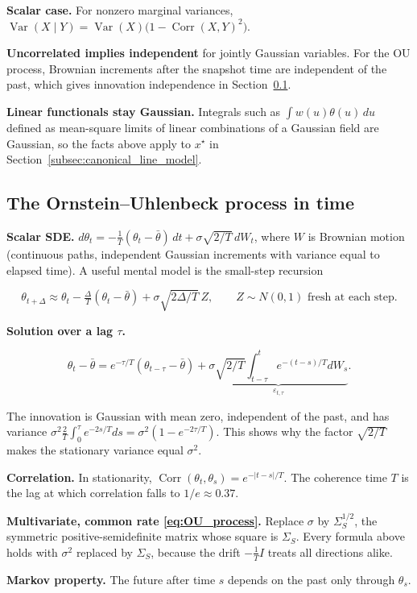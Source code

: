 \textbf{Scalar case.} For nonzero marginal variances, $\operatorname{Var}(X\mid Y)=\operatorname{Var}(X)\big(1-\operatorname{Corr}(X,Y)^2\big)$.

\textbf{Uncorrelated implies independent} for jointly Gaussian variables. For the OU process, Brownian increments after the snapshot time are independent
of the past, which gives innovation independence in Section~\ref{app:toolkit-4}.

\textbf{Linear functionals stay Gaussian.} Integrals such as $\int w(u)\theta(u)\,du$ defined as mean-square limits of linear combinations of a Gaussian field are Gaussian, so the facts above apply to $x^\star$ in Section~\ref{subsec:canonical_line_model}.

\subsection{The Ornstein--Uhlenbeck process in time}
\label{app:toolkit-4}
\textbf{Scalar SDE.} $d\theta_t=-\tfrac1T(\theta_t-\bar\theta)\,dt+\sigma\sqrt{2/T}\,dW_t$, where $W$ is Brownian motion (continuous paths, independent Gaussian increments with variance equal to elapsed time). A useful mental model is the small-step recursion

\[
\theta_{t+\Delta}\approx\theta_t-\tfrac{\Delta}{T}(\theta_t-\bar\theta)+\sigma\sqrt{2\Delta/T}\,Z,\qquad Z\sim N(0,1)\text{ fresh at each step}.
\]

\textbf{Solution over a lag $\tau$.}

\[
\theta_t-\bar\theta=e^{-\tau/T}(\theta_{t-\tau}-\bar\theta)+\underbrace{\sigma\sqrt{2/T}\int_{t-\tau}^{t}e^{-(t-s)/T}dW_s}_{\varepsilon_{t,\tau}} .
\]

  The innovation is Gaussian with mean zero, independent of the past, and has variance $\sigma^2\tfrac2T\int_0^\tau e^{-2s/T}ds=\sigma^2(1-e^{-2\tau/T})$. This shows why the factor $\sqrt{2/T}$ makes the stationary variance equal $\sigma^2$.

\textbf{Correlation.} In stationarity, $\operatorname{Corr}(\theta_t,\theta_s)=e^{-|t-s|/T}$. The coherence time $T$ is the lag at which correlation falls to $1/e\approx0.37$.

\textbf{Multivariate, common rate \eqref{eq:OU_process}.} Replace $\sigma$ by $\Sigma_S^{1/2}$, the symmetric positive-semidefinite matrix whose square is $\Sigma_S$. Every formula above holds with $\sigma^2$ replaced by $\Sigma_S$, because the drift $-\tfrac1T I$ treats all directions alike.

\textbf{Markov property.} The future after time $s$ depends on the past only through $\theta_s$.

